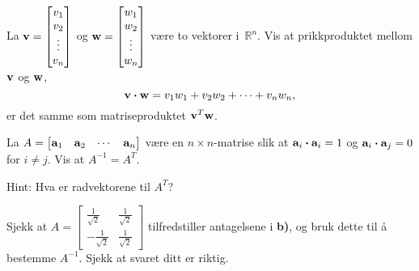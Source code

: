\begin{oppgave}


\begin{punkt}
La $\mathbf{v}=\begin{bmatrix}
v_1\\
v_2\\
\vdots\\
v_n
\end{bmatrix}$ og $\mathbf{w}=\begin{bmatrix}
w_1\\
w_2\\
\vdots\\
w_n
\end{bmatrix}$ være to vektorer i~$\mathbb{R}^n$. Vis at prikkproduktet mellom $\mathbf{v}$ og $\mathbf{w}$, $$\mathbf{v}\boldsymbol{\cdot} \mathbf{w}=v_1w_1+v_2w_2+\cdots+v_nw_n,$$ er det samme som matriseproduktet $\mathbf{v}^T\mathbf{w}$.
\end{punkt}

\begin{punkt}
La $A=\begin{bmatrix}
\mathbf{a}_1 & \mathbf{a}_2 & \cdots & \mathbf{a}_n
\end{bmatrix}
$ være en $n\times n$-matrise slik at $\mathbf{a}_i \boldsymbol{\cdot} \mathbf{a}_i=1$ og $\mathbf{a}_i\boldsymbol{\cdot} \mathbf{a}_j=0$ for $i\neq j$. Vis at $A^{-1}=A^T$.

Hint: Hva er radvektorene til $A^T$?
\end{punkt}

\begin{punkt}
Sjekk at $A=\begin{bmatrix}
\frac{1}{\sqrt{2}} & \frac{1}{\sqrt{2}}\\
-\frac{1}{\sqrt{2}} & \frac{1}{\sqrt{2}}
\end{bmatrix}$
tilfredstiller antagelsene i \textbf{b)}, og bruk dette til å bestemme $A^{-1}$. Sjekk at svaret ditt er riktig.
\end{punkt}

\end{oppgave}


